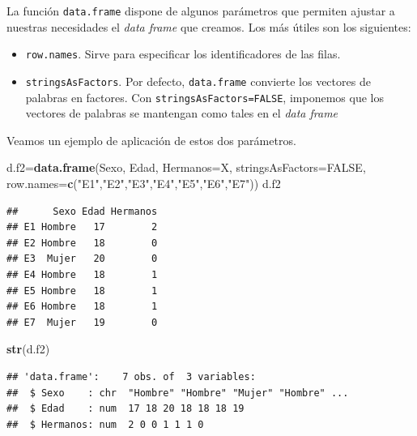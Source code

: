 \documentclass[]{book}
\newenvironment{Shaded}{\begin{snugshade}}{\end{snugshade}}
\newcommand{\DataTypeTok}[1]{\textcolor[rgb]{0.13,0.29,0.53}{#1}}
\newcommand{\KeywordTok}[1]{\textcolor[rgb]{0.13,0.29,0.53}{\textbf{#1}}}
\newcommand{\NormalTok}[1]{#1}
\newcommand{\OperatorTok}[1]{\textcolor[rgb]{0.81,0.36,0.00}{\textbf{#1}}}
\newcommand{\OtherTok}[1]{\textcolor[rgb]{0.56,0.35,0.01}{#1}}
\newcommand{\StringTok}[1]{\textcolor[rgb]{0.31,0.60,0.02}{#1}}
\theoremstyle{definition}
\theoremstyle{definition}
\theoremstyle{definition}
\theoremstyle{remark}
\begin{document}
La función \texttt{data.frame} dispone de algunos parámetros que permiten ajustar a nuestras necesidades el \emph{data frame} que creamos. Los más útiles son los siguientes:

\begin{itemize}
\item
  \texttt{row.names}. Sirve para especificar los identificadores de las filas.
\item
  \texttt{stringsAsFactors}. Por defecto, \texttt{data.frame} convierte los vectores de palabras en factores. Con \texttt{stringsAsFactors=FALSE}, imponemos que los vectores de palabras se mantengan como tales en el \emph{data frame}
\end{itemize}

Veamos un ejemplo de aplicación de estos dos parámetros.

\begin{Shaded}
\begin{Highlighting}[]
\NormalTok{d.f2=}\KeywordTok{data.frame}\NormalTok{(Sexo, Edad, }\DataTypeTok{Hermanos=}\NormalTok{X, }\DataTypeTok{stringsAsFactors=}\OtherTok{FALSE}\NormalTok{, }
  \DataTypeTok{row.names=}\KeywordTok{c}\NormalTok{(}\StringTok{"E1"}\NormalTok{,}\StringTok{"E2"}\NormalTok{,}\StringTok{"E3"}\NormalTok{,}\StringTok{"E4"}\NormalTok{,}\StringTok{"E5"}\NormalTok{,}\StringTok{"E6"}\NormalTok{,}\StringTok{"E7"}\NormalTok{))}
\NormalTok{d.f2}
\end{Highlighting}
\end{Shaded}

\begin{verbatim}
##      Sexo Edad Hermanos
## E1 Hombre   17        2
## E2 Hombre   18        0
## E3  Mujer   20        0
## E4 Hombre   18        1
## E5 Hombre   18        1
## E6 Hombre   18        1
## E7  Mujer   19        0
\end{verbatim}

\begin{Shaded}
\begin{Highlighting}[]
\KeywordTok{str}\NormalTok{(d.f2)}
\end{Highlighting}
\end{Shaded}

\begin{verbatim}
## 'data.frame':    7 obs. of  3 variables:
##  $ Sexo    : chr  "Hombre" "Hombre" "Mujer" "Hombre" ...
##  $ Edad    : num  17 18 20 18 18 18 19
##  $ Hermanos: num  2 0 0 1 1 1 0
\end{verbatim}

\begin{Shaded}
\end{Shaded}
\end{document}
